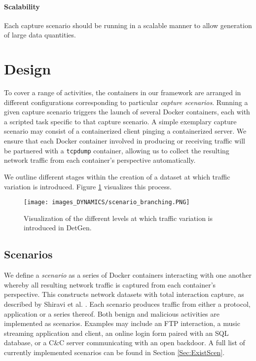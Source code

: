 \paragraph{Scalability} Each capture scenario should be running in a scalable manner to allow generation of large data quantities.



\section{Design}\label{Sec:Design}

To cover a range of activities, the containers in our framework are arranged in different configurations corresponding to particular \emph{capture scenarios}. Running a given capture scenario triggers the launch of several Docker containers, each with a scripted task specific to that capture scenario. A simple exemplary capture scenario may consist of a containerized client pinging a containerized server. We ensure that each Docker container involved in producing or receiving traffic will be partnered with a \texttt{tcpdump} container, allowing us to collect the resulting network traffic from each container's perspective automatically. 

We outline different stages within the creation of a dataset at which traffic variation is introduced. Figure \ref{Fig:branching} visualizes this process.


\begin{figure}
 \centering 
 \texttt{[image: images\_DYNAMICS/scenario\_branching.PNG]}
 \caption{Visualization of the different levels at which traffic variation is introduced in DetGen.}
 \label{Fig:branching}
\end{figure}


\subsection{Scenarios}
\label{Sec:Scenarios}

We define a \emph{scenario} as a series of Docker containers interacting with one another whereby all resulting network traffic is captured from each container's perspective. This constructs network datasets with total interaction capture, as described by Shiravi et al. \cite{shiravi2012toward}. Each scenario produces traffic from either a protocol, application or a series thereof. Both benign and malicious activities are implemented as scenarios. Examples may include an FTP interaction, a music streaming application and client, an online login form paired with an SQL database, or a C\&C server communicating with an open backdoor. A full list of currently implemented scenarios can be found in Section \ref{Sec:ExistScen}.

